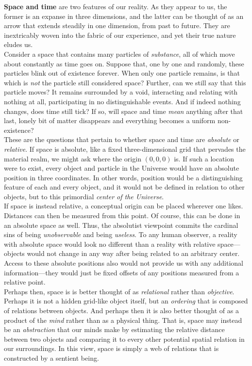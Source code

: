\textbf{Space and time} are two features of our reality. As they appear to us, the former is an expanse in three dimensions, and the latter can be thought of as an arrow that extends steadily in one dimension, from past to future. They are inextricably woven into the fabric of our experience, and yet their true nature eludes us. \\

Consider a space that contains many particles of \textit{substance}, all of which move about constantly as time goes on. Suppose that, one by one and randomly, these particles blink out of existence forever. When only one particle remains, is that which is \textit{not} the particle still considered space? Further, can we still say that this particle moves? It remains surrounded by a void, interacting and relating with nothing at all, participating in no distinguishable events. And if indeed nothing changes, does time still tick? If so, will space and time \textit{mean} anything after that last, lonely bit of matter disappears and everything becomes a uniform non-existence? \\

These are the questions that pertain to whether space and time are \textit{absolute} or \textit{relative}. If space is absolute, like a fixed three-dimensional grid that pervades the material realm, we might ask where the origin $(0,0,0)$ is. If such a location were to exist, every object and particle in the Universe would have an absolute position in three coordinates. In other words, position would be a distinguishing feature of each and every object, and it would not be defined in relation to other objects, but to this primordial \textit{center of the Universe}. \\

If space is instead relative, a conceptual origin can be placed wherever one likes. Distances can then be measured from this point. Of course, this can be done in an absolute space as well. Thus, the absolutist viewpoint commits the cardinal sins of being \textit{unobservable} and being \textit{useless}. To any human observer, a reality with absolute space would look no different than a reality with relative space---objects would not change in any way after being related to an arbitrary center. Access to these absolute positions also would not provide us with any additional information---they would just be fixed offsets of any positions measured from a relative point. \\

Perhaps then, space is is better thought of as \textit{relational} rather than \textit{objective}. Perhaps it is not a hidden grid-like object itself, but an \textit{ordering} that is composed of relations between objects. And perhaps then it is also better thought of as a product of the \textit{mind} rather than as a physical thing. That is, space may instead be an \textit{abstraction} that our minds make by estimating the relative distance between two objects and comparing it to every other potential spatial relation in our surroundings. In this view, space is simply a web of relations that is constructed by a sentient being. \\

